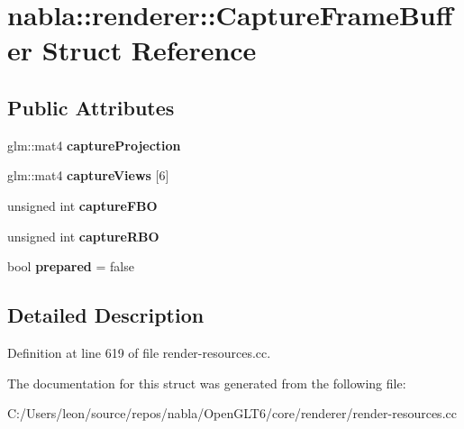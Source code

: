 \hypertarget{structnabla_1_1renderer_1_1_capture_frame_buffer}{}\section{nabla\+::renderer\+::Capture\+Frame\+Buffer Struct Reference}
\label{structnabla_1_1renderer_1_1_capture_frame_buffer}
\subsection*{Public Attributes}
\begin{DoxyCompactItemize}
\item 
\mbox{\label{structnabla_1_1renderer_1_1_capture_frame_buffer_a8f1742d71b86b15fcd875b836e5a02d7}} 
glm\+::mat4 {\bfseries capture\+Projection}
\item 
\mbox{\label{structnabla_1_1renderer_1_1_capture_frame_buffer_a3e65a3be955c4b57f8ecb160b61dcdca}} 
glm\+::mat4 {\bfseries capture\+Views} \mbox{[}6\mbox{]}
\item 
\mbox{\label{structnabla_1_1renderer_1_1_capture_frame_buffer_a5001511b5671003f08e6340bd171e7fe}} 
unsigned int {\bfseries capture\+F\+BO}
\item 
\mbox{\label{structnabla_1_1renderer_1_1_capture_frame_buffer_a73153743b7353e7bb20f9f415b304549}} 
unsigned int {\bfseries capture\+R\+BO}
\item 
\mbox{\label{structnabla_1_1renderer_1_1_capture_frame_buffer_addda222a1ac45c6ce641ce042198a55d}} 
bool {\bfseries prepared} = false
\end{DoxyCompactItemize}


\subsection{Detailed Description}


Definition at line 619 of file render-\/resources.\+cc.



The documentation for this struct was generated from the following file\+:\begin{DoxyCompactItemize}
\item 
C\+:/\+Users/leon/source/repos/nabla/\+Open\+G\+L\+T6/core/renderer/render-\/resources.\+cc\end{DoxyCompactItemize}
